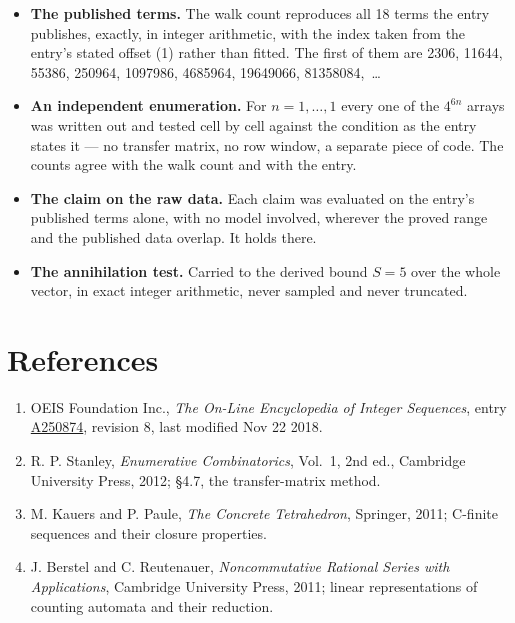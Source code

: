 \documentclass[11pt]{article}
\theoremstyle{definition}
\begin{document}
\begin{itemize}

\item {\bfseries The published terms.} The walk count reproduces all 18 terms the entry publishes, exactly, in integer arithmetic, with the index taken from the entry's stated offset (1) rather than fitted. The first of them are 2306, 11644, 55386, 250964, 1097986, 4685964, 19649066, 81358084,~\dots

\item {\bfseries An independent enumeration.} For $n = 1,\dots,1$ every one of the $4^{6n}$ arrays was written out and tested cell by cell against the condition as the entry states it --- no transfer matrix, no row window, a separate piece of code. The counts agree with the walk count and with the entry.

\item {\bfseries The claim on the raw data.} Each claim was evaluated on the entry's published terms alone, with no model involved, wherever the proved range and the published data overlap. It holds there.

\item {\bfseries The annihilation test.} Carried to the derived bound $S = 5$ over the whole vector, in exact integer arithmetic, never sampled and never truncated.

\end{itemize}

\section{References}

\begin{enumerate}

\item OEIS Foundation Inc., \emph{The On-Line Encyclopedia of Integer Sequences}, entry \href{https://oeis.org/A250874}{A250874}, revision 8, last modified Nov 22 2018.

\item R. P. Stanley, \emph{Enumerative Combinatorics}, Vol.~1, 2nd ed., Cambridge University Press, 2012; \S4.7, the transfer-matrix method.

\item M. Kauers and P. Paule, \emph{The Concrete Tetrahedron}, Springer, 2011; C-finite sequences and their closure properties.

\item J. Berstel and C. Reutenauer, \emph{Noncommutative Rational Series with Applications}, Cambridge University Press, 2011; linear representations of counting automata and their reduction.

\end{enumerate}
\end{document}
